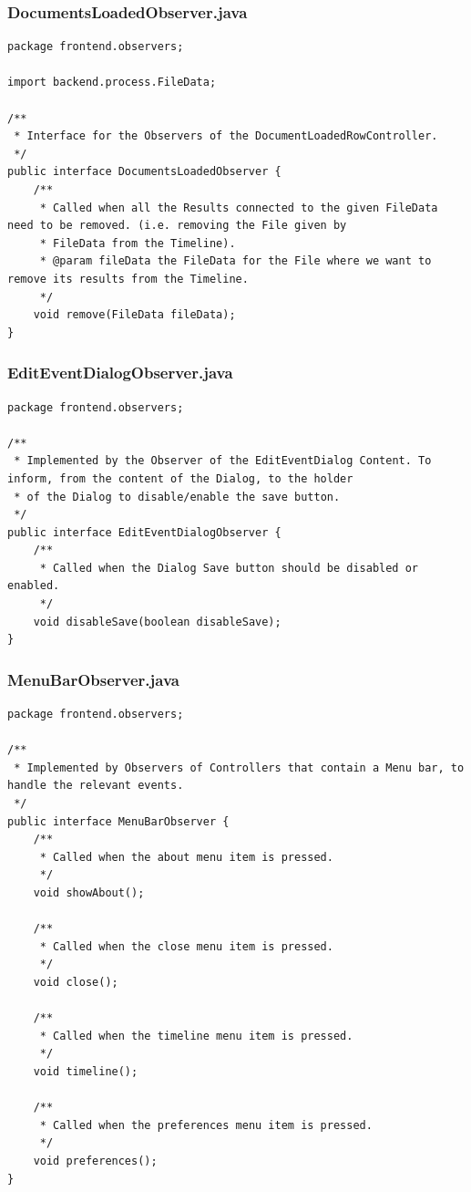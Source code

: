 \subsubsection{DocumentsLoadedObserver.java}
\begin{lstlisting}
package frontend.observers;

import backend.process.FileData;

/**
 * Interface for the Observers of the DocumentLoadedRowController.
 */
public interface DocumentsLoadedObserver {
    /**
     * Called when all the Results connected to the given FileData need to be removed. (i.e. removing the File given by
     * FileData from the Timeline).
     * @param fileData the FileData for the File where we want to remove its results from the Timeline.
     */
    void remove(FileData fileData);
}
\end{lstlisting}
\subsubsection{EditEventDialogObserver.java}
\begin{lstlisting}
package frontend.observers;

/**
 * Implemented by the Observer of the EditEventDialog Content. To inform, from the content of the Dialog, to the holder
 * of the Dialog to disable/enable the save button.
 */
public interface EditEventDialogObserver {
    /**
     * Called when the Dialog Save button should be disabled or enabled.
     */
    void disableSave(boolean disableSave);
}
\end{lstlisting}
\subsubsection{MenuBarObserver.java}
\begin{lstlisting}
package frontend.observers;

/**
 * Implemented by Observers of Controllers that contain a Menu bar, to handle the relevant events.
 */
public interface MenuBarObserver {
    /**
     * Called when the about menu item is pressed.
     */
    void showAbout();

    /**
     * Called when the close menu item is pressed.
     */
    void close();

    /**
     * Called when the timeline menu item is pressed.
     */
    void timeline();

    /**
     * Called when the preferences menu item is pressed.
     */
    void preferences();
}
\end{lstlisting}
